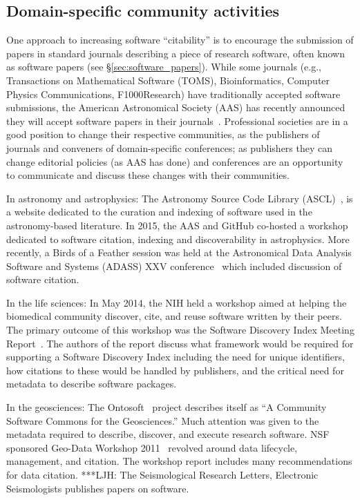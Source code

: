 \documentclass[11pt, oneside]{amsart}
\newcommand{\LJHnote}[1]{ {\textcolor{fuschsia} { ***LJH: #1 }}} %
\begin{document}
\subsection{Domain-specific community activities}

One approach to increasing software ``citability''   is to encourage the
submission of papers in standard journals describing a piece of research
software, often known as software papers (see \S\ref{sec:software_papers}).
While some journals (e.g., Transactions on Mathematical Software (TOMS),
Bioinformatics, Computer Physics Communications, F1000Research) have
traditionally accepted software submissions, the American Astronomical Society
(AAS) has recently announced they will accept software papers in their
journals~\cite{aas-sofware-papers}. Professional societies are in a good
position to change their respective communities, as the publishers of journals
and conveners of domain-specific conferences; as publishers they can change
editorial policies (as AAS has done) and conferences are an opportunity to
communicate and discuss these changes with their communities.

In astronomy and astrophysics: The Astronomy Source Code Library
(ASCL)~\cite{ascl}, is a website dedicated to the curation and indexing of
software used in the astronomy-based literature. In 2015, the AAS and GitHub
co-hosted a workshop~\cite{aas-software-index} dedicated to software citation,
indexing and discoverability in astrophysics. More recently, a Birds of a Feather session was
held at the Astronomical Data Analysis Software and Systems (ADASS) XXV
conference~\cite{2015arXiv151207919A} which included discussion of software
citation.

In the life sciences: In May 2014, the NIH held a workshop aimed at helping the
biomedical community discover, cite, and reuse software written by their peers.
The primary outcome of this workshop was the Software Discovery Index Meeting
Report~\cite{software-discovery-index}. The authors of the report discuss
what framework would be required for supporting a Software Discovery Index
including the need for unique identifiers, how citations to these would be
handled by publishers, and the critical need for metadata to describe software
packages.

In the geosciences: The Ontosoft~\cite{ontosoft} project describes itself as ``A
Community Software Commons for the Geosciences.'' Much attention was given to the
metadata required to describe, discover, and execute research software. NSF sponsored
Geo-Data Workshop 2011~\cite{nsf-geo-data} revolved around data lifecycle, management, and
citation. The workshop report includes many recommendations for data
citation. \LJHnote{ The Seismological Research Letters, Electronic Seismologists
publishes papers on software.} %
\end{document}
